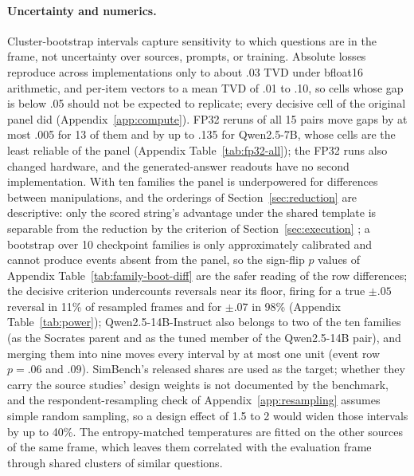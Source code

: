 \documentclass[11pt]{article}
\begin{document}
\paragraph{Uncertainty and numerics.}
Cluster-bootstrap intervals capture sensitivity to which questions are in the
frame, not uncertainty over sources, prompts, or training. Absolute losses
reproduce across implementations only to about .03 TVD under bfloat16
arithmetic, and per-item vectors to a mean TVD of .01 to .10, so cells whose
gap is below .05 should not be expected to replicate; every decisive cell of the original panel did (Appendix~\ref{app:compute}). FP32 reruns of all 15 pairs move gaps by at most .005 for 13 of them and by up to .135 for Qwen2.5-7B, whose cells are the least reliable of the panel (Appendix Table~\ref{tab:fp32-all}); the FP32 runs also changed hardware, and the generated-answer readouts have no second implementation. With ten families the panel is underpowered for differences between manipulations, and the orderings of Section~\ref{sec:reduction} are descriptive: only the scored string's advantage under the shared template is separable from the reduction by the criterion of Section~\ref{sec:execution} \citep{card-etal-2020-little,dror-etal-2018-hitchhikers}; a bootstrap over 10 checkpoint families is only approximately calibrated and cannot produce events absent from the panel, so the sign-flip $p$ values of Appendix Table~\ref{tab:family-boot-diff} are the safer reading of the row differences; the decisive criterion undercounts reversals near its floor, firing for a true $\pm.05$ reversal in 11\% of resampled frames and for $\pm.07$ in 98\% (Appendix Table~\ref{tab:power}); Qwen2.5-14B-Instruct also belongs to two of the ten families (as the Socrates parent and as the tuned member of the Qwen2.5-14B pair), and merging them into nine moves every interval by at most one unit (event row $p=.06$ and $.09$). SimBench's released shares are used as the target; whether they carry the source studies' design weights is not documented by the benchmark, and the respondent-resampling check of Appendix~\ref{app:resampling} assumes simple random sampling, so a design effect of 1.5 to 2 would widen those intervals by up to 40\%. The entropy-matched
temperatures are fitted on the other sources of the same frame, which
leaves them correlated with the evaluation frame through shared clusters of
similar questions.
\end{document}
